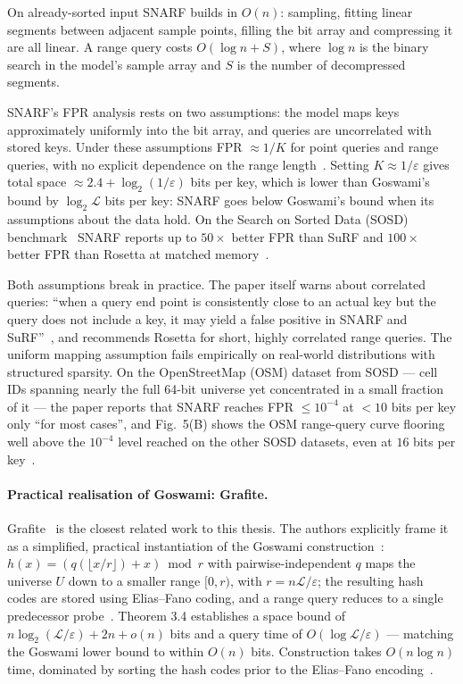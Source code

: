 On already-sorted input SNARF builds in $O(n)$: sampling, fitting
linear segments between adjacent sample points, filling the bit
array and compressing it are all linear.
A range query costs $O(\log n + S)$, where $\log n$
is the binary search in the model's sample array and $S$ is the
number of decompressed segments.

SNARF's FPR analysis rests on two assumptions: the model maps
keys approximately uniformly into the bit array, and queries are
uncorrelated with stored keys. Under these assumptions FPR
$\approx 1/K$ for point queries and range queries, with no
explicit dependence on the range
length~\citep[\S3]{vaidya2022snarf}. Setting $K \approx
1/\varepsilon$ gives total space $\approx 2.4 +
\log_2(1/\varepsilon)$ bits per key, which is lower than Goswami's
bound by $\log_2 \mathcal{L}$ bits per key: SNARF goes below
Goswami's bound when its assumptions about the data hold.
On the Search on Sorted Data (SOSD)
benchmark~\citep{kipf2019sosd} SNARF reports up to $50\times$
better FPR than SuRF and $100\times$ better FPR than Rosetta at
matched memory~\citep[\S2]{vaidya2022snarf}.

Both assumptions break in practice.
The paper itself warns about correlated queries: ``when a query end point is consistently
close to an actual key but the query does not include a key, it
may yield a false positive in SNARF and
SuRF''~\citep[\S4.1]{vaidya2022snarf}, and recommends Rosetta for
short, highly correlated range queries. The uniform mapping
assumption fails empirically on real-world distributions with
structured sparsity. On the OpenStreetMap (OSM) dataset from SOSD
--- cell IDs spanning nearly the full 64-bit universe yet
concentrated in a small fraction of it --- the paper reports that
SNARF reaches FPR $\leq 10^{-4}$ at $< 10$ bits per key only
``for most cases'', and Fig.~5(B) shows the OSM range-query curve
flooring well above the $10^{-4}$ level reached on the other SOSD
datasets, even at $16$ bits per
key~\citep[\S6.1.2, Fig.~5(B)]{vaidya2022snarf}.

\paragraph{Practical realisation of Goswami: Grafite.}
Grafite~\citep{grafite2024} is the closest related work to this thesis.
The authors explicitly frame it as a simplified, practical
instantiation of the Goswami construction~\citep[\S3]{grafite2024}:
$h(x) = (q(\lfloor x/r \rfloor) + x) \bmod r$ with
pairwise-independent $q$ maps the universe $U$ down to a smaller
range $[0, r)$, with $r = n\mathcal{L}/\varepsilon$; the resulting hash
codes are stored using Elias--Fano coding, and a range query reduces
to a single predecessor probe~\citep[Algorithm 2]{grafite2024}.
Theorem 3.4 establishes a space bound of
$n \log_2(\mathcal{L}/\varepsilon) + 2n + o(n)$ bits and a query
time of $O(\log \mathcal{L}/\varepsilon)$ --- matching the Goswami
lower bound to within $O(n)$ bits.
Construction takes $O(n \log n)$ time, dominated by sorting the
hash codes prior to the Elias--Fano
encoding~\citep[Algorithm 1]{grafite2024}.

